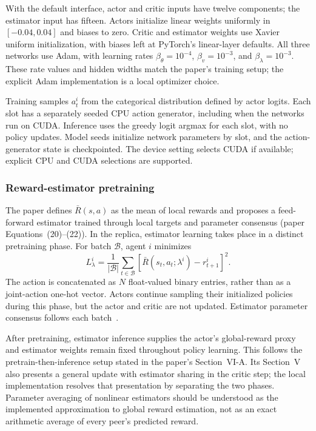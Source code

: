 \documentclass[11pt,a4paper]{article}
\newcommand{\code}[1]{\texttt{\detokenize{#1}}}
\begin{document}
With the default interface, actor and critic inputs have twelve components;
the estimator input has fifteen. Actors initialize linear weights uniformly
in $[-0.04,0.04]$ and biases to zero. Critic and estimator weights use Xavier
uniform initialization, with biases left at PyTorch's linear-layer defaults.
All three networks use Adam, with learning rates
$\beta_\theta=10^{-4}$, $\beta_v=10^{-3}$, and
$\beta_\lambda=10^{-3}$. These rate values and hidden widths match the paper's
training setup; the explicit Adam implementation is a local optimizer choice.

Training samples $a_t^i$ from the categorical distribution defined by actor
logits. Each slot has a separately seeded CPU action generator, including when
the networks run on CUDA. Inference uses the greedy logit argmax for each slot,
with no policy updates. Model seeds initialize network parameters by slot, and
the action-generator state is checkpointed. The \code{auto} device setting
selects CUDA if available; explicit CPU and CUDA selections are supported.

\subsubsection{Reward-estimator pretraining}

The paper defines $\bar R(s,a)$ as the mean of local rewards and proposes a
feed-forward estimator trained through local targets and parameter consensus
(paper Equations~(20)--(22)). In the replica, estimator learning takes place in
a distinct pretraining phase. For batch $\mathcal B$, agent $i$ minimizes
\begin{equation}
 L_\lambda^i=\frac{1}{|\mathcal B|}\sum_{t\in\mathcal B}
 \left[\bar R(s_t,a_t;\lambda^i)-r_{t+1}^i\right]^2.
 \label{eq:estimator-loss}
\end{equation}
The action is concatenated as $N$ float-valued binary entries, rather than as
a joint-action one-hot vector. Actors continue sampling their initialized
policies during this phase, but the actor and critic are not updated.
Estimator parameter consensus follows each batch~\cite{code-learning,code-consensus}.

After pretraining, estimator inference supplies the actor's global-reward proxy
and estimator weights remain fixed throughout policy learning. This follows
the pretrain-then-inference setup stated in the paper's Section~VI-A. Its
Section~V also presents a general update with estimator sharing in the critic
step; the local implementation resolves that presentation by separating the
two phases. Parameter averaging of nonlinear estimators should be understood
as the implemented approximation to global reward estimation, not as an exact
arithmetic average of every peer's predicted reward.
\end{document}

